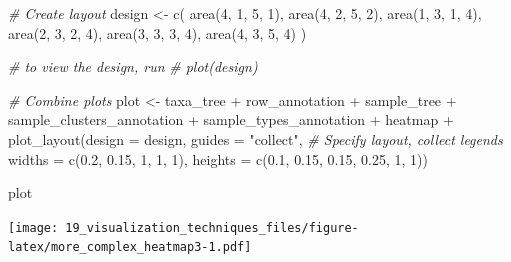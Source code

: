 \documentclass[
]{book}
\newenvironment{Shaded}{\begin{snugshade}}{\end{snugshade}}
\newcommand{\AttributeTok}[1]{\textcolor[rgb]{0.77,0.63,0.00}{#1}}
\newcommand{\CommentTok}[1]{\textcolor[rgb]{0.56,0.35,0.01}{\textit{#1}}}
\newcommand{\DecValTok}[1]{\textcolor[rgb]{0.00,0.00,0.81}{#1}}
\newcommand{\FloatTok}[1]{\textcolor[rgb]{0.00,0.00,0.81}{#1}}
\newcommand{\FunctionTok}[1]{\textcolor[rgb]{0.00,0.00,0.00}{#1}}
\newcommand{\NormalTok}[1]{#1}
\newcommand{\OtherTok}[1]{\textcolor[rgb]{0.56,0.35,0.01}{#1}}
\newcommand{\SpecialCharTok}[1]{\textcolor[rgb]{0.00,0.00,0.00}{#1}}
\newcommand{\StringTok}[1]{\textcolor[rgb]{0.31,0.60,0.02}{#1}}
\begin{document}
\begin{Shaded}
\begin{Highlighting}[]
\CommentTok{\# Create layout}
\NormalTok{design }\OtherTok{\textless{}{-}} \FunctionTok{c}\NormalTok{(}
  \FunctionTok{area}\NormalTok{(}\DecValTok{4}\NormalTok{, }\DecValTok{1}\NormalTok{, }\DecValTok{5}\NormalTok{, }\DecValTok{1}\NormalTok{),}
  \FunctionTok{area}\NormalTok{(}\DecValTok{4}\NormalTok{, }\DecValTok{2}\NormalTok{, }\DecValTok{5}\NormalTok{, }\DecValTok{2}\NormalTok{),}
  \FunctionTok{area}\NormalTok{(}\DecValTok{1}\NormalTok{, }\DecValTok{3}\NormalTok{, }\DecValTok{1}\NormalTok{, }\DecValTok{4}\NormalTok{),}
  \FunctionTok{area}\NormalTok{(}\DecValTok{2}\NormalTok{, }\DecValTok{3}\NormalTok{, }\DecValTok{2}\NormalTok{, }\DecValTok{4}\NormalTok{),}
  \FunctionTok{area}\NormalTok{(}\DecValTok{3}\NormalTok{, }\DecValTok{3}\NormalTok{, }\DecValTok{3}\NormalTok{, }\DecValTok{4}\NormalTok{),}
  \FunctionTok{area}\NormalTok{(}\DecValTok{4}\NormalTok{, }\DecValTok{3}\NormalTok{, }\DecValTok{5}\NormalTok{, }\DecValTok{4}\NormalTok{)}
\NormalTok{)}

\CommentTok{\# to view the design, run}
\CommentTok{\# plot(design)}

\CommentTok{\# Combine plots}
\NormalTok{plot }\OtherTok{\textless{}{-}}\NormalTok{ taxa\_tree }\SpecialCharTok{+} 
\NormalTok{  row\_annotation }\SpecialCharTok{+}
\NormalTok{  sample\_tree }\SpecialCharTok{+} 
\NormalTok{  sample\_clusters\_annotation }\SpecialCharTok{+}
\NormalTok{  sample\_types\_annotation }\SpecialCharTok{+}
\NormalTok{  heatmap }\SpecialCharTok{+}
    \FunctionTok{plot\_layout}\NormalTok{(}\AttributeTok{design =}\NormalTok{ design, }\AttributeTok{guides =} \StringTok{"collect"}\NormalTok{, }\CommentTok{\# Specify layout, collect legends}
                \AttributeTok{widths =} \FunctionTok{c}\NormalTok{(}\FloatTok{0.2}\NormalTok{, }\FloatTok{0.15}\NormalTok{, }\DecValTok{1}\NormalTok{, }\DecValTok{1}\NormalTok{, }\DecValTok{1}\NormalTok{),}
                \AttributeTok{heights =} \FunctionTok{c}\NormalTok{(}\FloatTok{0.1}\NormalTok{, }\FloatTok{0.15}\NormalTok{, }\FloatTok{0.15}\NormalTok{, }\FloatTok{0.25}\NormalTok{, }\DecValTok{1}\NormalTok{, }\DecValTok{1}\NormalTok{))}

\NormalTok{plot}
\end{Highlighting}
\end{Shaded}

\texttt{[image: 19\_visualization\_techniques\_files/figure-latex/more\_complex\_heatmap3-1.pdf]}
\end{document}
